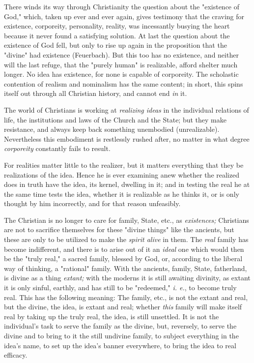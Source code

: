 There winds its way through Christianity the question about the "{}existence 
of God,"{} which, taken up ever and ever again, gives testimony that the 
craving for existence, corporeity, personality, reality, was incessantly 
busying the heart because it never found a satisfying solution. At last the 
question about the existence of God fell, but only to rise up again in the 
proposition that the "{}divine"{} had existence (Feuerbach). But this too has 
no existence, and neither will the last refuge, that the "{}purely human"{} is 
realizable, afford shelter much longer. No idea has existence, for none is 
capable of corporeity. The scholastic contention of realism and nominalism has 
the same content; in short, this spins itself out through all Christian 
history, and cannot end \textit{in} it.

The world of Christians is working at \textit{realizing ideas} in the 
individual relations of life, the institutions and laws of the Church and the 
State; but they make resistance, and always keep back something unembodied 
(unrealizable). Nevertheless this embodiment is restlessly rushed after, no 
matter in what degree \textit{corporeity} constantly fails to result.

For realities matter little to the realizer, but it matters everything that 
they be realizations of the idea. Hence he is ever examining anew whether the 
realized does in truth have the idea, its kernel, dwelling in it; and in 
testing the real he at the same time tests the idea, whether it is realizable 
as he thinks it, or is only thought by him incorrectly, and for that reason 
unfeasibly.

The Christian is no longer to care for family, State, etc., as 
\textit{existences;} Christians are not to sacrifice themselves for these 
"{}divine things"{} like the ancients, but these are only to be utilized to 
make the \textit{spirit alive} in them. The \textit{real} family has become 
indifferent, and there is to arise out of it an \textit{ideal} one which would 
then be the "{}truly real,"{} a sacred family, blessed by God, or, according 
to the liberal way of thinking, a "{}rational"{} family. With the ancients, 
family, State, fatherland, is divine as a thing \textit{extant;} with the 
moderns it is still awaiting divinity, as extant it is only sinful, earthly, 
and has still to be "{}redeemed,"{} \textit{i. e.}, to become truly real. This 
has the following meaning: The family, etc., is not the extant and real, but 
the divine, the idea, is extant and real; whether \textit{this} family will 
make itself real by taking up the truly real, the idea, is still unsettled. It 
is not the individual's task to serve the family as the divine, but, 
reversely, to serve the divine and to bring to it the still undivine family, 
to subject everything in the idea's name, to set up the idea's banner 
everywhere, to bring the idea to real efficacy.

